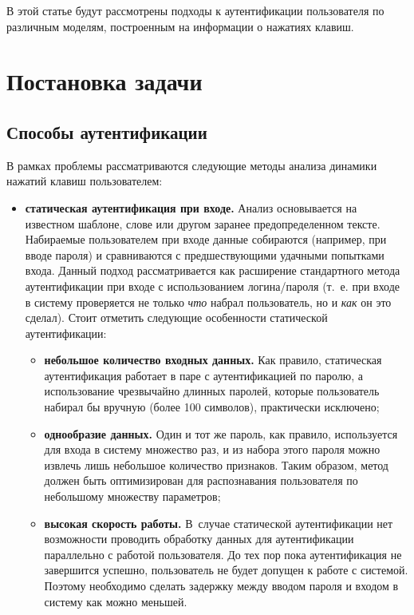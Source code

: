 \begin{multicols}{2}
В этой статье будут рассмотрены подходы к аутентификации
пользователя по различным моделям, построенным на информации о
нажатиях клавиш.

\section{Постановка задачи}

\subsection{Способы аутентификации}
В рамках проблемы рассматриваются сле\-ду\-ющие методы анализа динамики нажатий клавиш пользователем:
\begin{itemize}
    \item \textbf{статическая аутентификация при входе.} Анализ основывается на известном шаблоне, слове или другом заранее предопределенном тексте. Набираемые пользователем при входе данные собираются (например, при вводе пароля) и сравниваются с предшествующими удачными попытками входа. Данный подход рассматривается как расширение стандартного метода аутентификации при входе с использованием логина/пароля (т.~е. при входе в систему проверяется не только \textit{что} набрал пользователь, но и \textit{как} он это сделал). Стоит отметить следующие особенности статической аутентификации:
    \begin{itemize}\label{goal}
        \item {\bf небольшое количество входных данных.} Как правило, статическая аутентификация работает в паре с аутентификацией по паролю, а использование чрезвычайно длинных паролей, которые пользователь набирал бы вручную (более 100 символов), практически исключено;
        \item {\bf однообразие данных.} Один и тот же пароль, как правило, используется 
        для входа в сис\-те\-му множество раз, и из набора этого пароля можно извлечь лишь небольшое количество признаков. Таким образом, метод должен быть оптимизирован для распознавания пользователя по небольшому множеству параметров;
         \item {\bf высокая скорость работы.} В~случае статической аутентификации нет возможности проводить обработку данных для аутентификации параллельно с работой пользователя. До тех пор пока аутентификация не завершится успешно, пользователь не будет допущен к работе с системой. Поэтому необходимо сделать задержку между вводом пароля и входом в систему как можно меньшей.
    \end{itemize}


\end{itemize}
\end{multicols}
